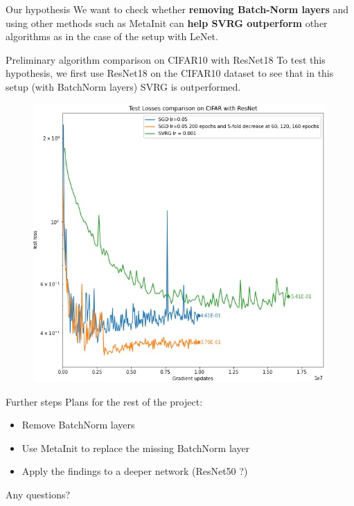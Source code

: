 \documentclass[10pt]{beamer}
\begin{document}
\begin{frame}{Our hypothesis}
    We want to check whether \textbf{removing Batch-Norm layers} and using other methods such as MetaInit can \textbf{help SVRG outperform} other algorithms as in the case of the setup with LeNet.
\end{frame}


\begin{frame}{Preliminary algorithm comparison on CIFAR10 with ResNet18}
    To test this hypothesis, we first use ResNet18 on the CIFAR10 dataset to see that in this setup (with BatchNorm layers) SVRG is outperformed.
    \begin{figure}
        \centering
    \includegraphics[scale=0.32]{midterm presentation/images/resnet18cifar.png}
        \label{fig:testLossesCifar}
    \end{figure}   
\end{frame}

\begin{frame}{Further steps}
    Plans for the rest of the project:
    \begin{itemize}
        \item Remove BatchNorm layers
        \item Use MetaInit to replace the missing BatchNorm layer
        \item Apply the findings to a deeper network (ResNet50 ?)
    \end{itemize}
\end{frame}

\begin{frame}{ }
\begin{center}
     \Huge Any questions?
\end{center}
   
\end{frame}
\end{document}
